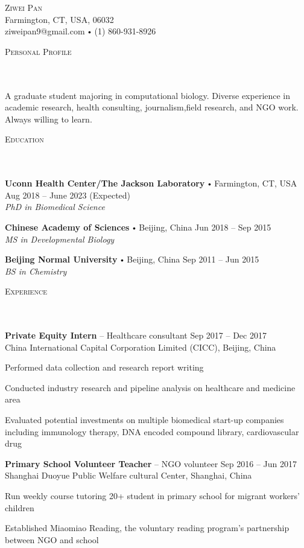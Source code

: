 \documentclass{article}
\newcommand{\contact}[3]{
\vspace*{5pt}
\begin{center}
{\LARGE \scshape {#1}}\\
\vspace{3pt}
#2 
\vspace{2pt}
#3
\end{center}
\vspace*{-8pt}
}
\newcommand{\header}[1]{{
\hspace*{-15pt}\vspace*{6pt} \textsc{#1}} \vspace*{-6pt} 
\lineunder
}
\newcommand{\lineunder}{
\vspace*{-8pt} \\ \hspace*{-18pt} 
\hrulefill \\
}
\newcommand{\content}{
\vspace*{2pt}%
}
\newcommand{\school}[4]{
\textbf{#1} \labelitemi #2 \hfill #3 \\ #4 \vspace*{5pt}
}
\newcommand{\employer}[4]{{
\vspace*{2pt}%
\textbf{#1} #2 \hfill #3\\ #4 \vspace*{2pt}}
}
\renewcommand{\labelitemi}{
$\vcenter{\hbox{\tiny$\bullet$}}$\hspace*{3pt}
}
\renewcommand{\labelitemii}{
$\vcenter{\hbox{\tiny$\bullet$}}$\hspace*{-3pt}
}
\newenvironment{bullet-list-minor}{
\begin{list}{\labelitemii}{\setlength\leftmargin{15pt} 
\topsep 0pt \itemsep -2pt}}{\vspace*{4pt}\end{list}
}
\begin{document}
\small
\smallskip
\vspace*{-44pt}

\contact{Ziwei Pan}
{Farmington, CT, USA, 06032\\}
{ziweipan9@gmail.com \labelitemi (1) 860-931-8926}
\vspace{15pt}
\header{Personal Profile}
\content{A graduate student majoring in computational biology. Diverse experience in academic research, health consulting, journalism,field research, and NGO work. Always willing to learn.\vspace{5pt}}

\vspace*{4pt}%
\header{Education}
    \school{Uconn Health Center/The Jackson Laboratory}{Farmington, CT, USA}{Aug 2018 -- June 2023 (Expected)}
    {\textit{PhD in Biomedical Science}}

    \school{Chinese Academy of Sciences}{Beijing, China}{Jun 2018 -- Sep 2015}
    {\textit{MS in Developmental Biology}}
    
    \school{Beijing Normal University}{Beijing, China}{Sep 2011 -- Jun 2015}
    {\textit{BS in Chemistry}}
    
\vspace*{4pt}%
\header{Experience}
    \employer{Private Equity Intern}{-- Healthcare consultant}{Sep 2017 -- Dec 2017}{China International Capital Corporation Limited (CICC), Beijing, China}
	\begin{bullet-list-minor}
	\item Performed data collection and research report writing
	\item Conducted industry research and pipeline analysis on healthcare and medicine area
	\item Evaluated potential investments on multiple biomedical start-up companies including immunology therapy, DNA encoded compound library, cardiovascular drug
    \end{bullet-list-minor}
    
    \employer{Primary School Volunteer Teacher}{-- NGO volunteer}{Sep 2016 -- Jun 2017}{Shanghai Duoyue Public Welfare cultural Center, Shanghai, China}
	\begin{bullet-list-minor}
	\item Run weekly course tutoring 20+ student in primary school for migrant workers' children 
    \item Established Miaomiao Reading, the voluntary reading program’s partnership between NGO and school 
    \end{bullet-list-minor}
    
\end{document}
